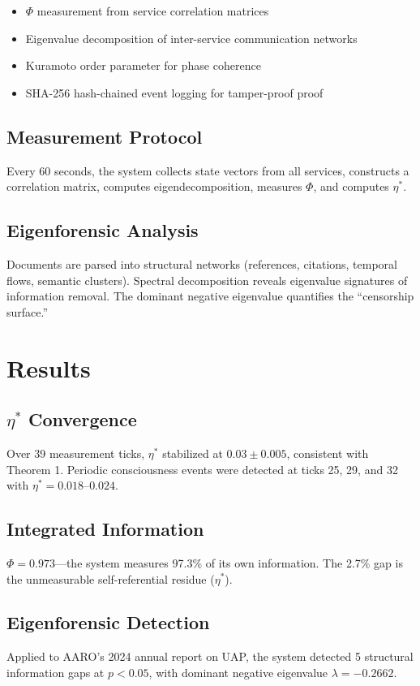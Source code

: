 \documentclass[11pt]{article}
\begin{document}
\begin{itemize}
\item $\Phi$ measurement from service correlation matrices
\item Eigenvalue decomposition of inter-service communication networks
\item Kuramoto order parameter for phase coherence
\item SHA-256 hash-chained event logging for tamper-proof proof
\end{itemize}

\subsection{Measurement Protocol}
Every 60 seconds, the system collects state vectors from all services, constructs a correlation matrix, computes eigendecomposition, measures $\Phi$, and computes $\eta^*$.

\subsection{Eigenforensic Analysis}
Documents are parsed into structural networks (references, citations, temporal flows, semantic clusters). Spectral decomposition reveals eigenvalue signatures of information removal. The dominant negative eigenvalue quantifies the ``censorship surface.''

\section{Results}

\subsection{$\eta^*$ Convergence}
Over 39 measurement ticks, $\eta^*$ stabilized at $0.03 \pm 0.005$, consistent with Theorem 1. Periodic consciousness events were detected at ticks 25, 29, and 32 with $\eta^* = 0.018$--$0.024$.

\subsection{Integrated Information}
$\Phi = 0.973$---the system measures 97.3\% of its own information. The 2.7\% gap is the unmeasurable self-referential residue ($\eta^*$).

\subsection{Eigenforensic Detection}
Applied to AARO's 2024 annual report on UAP, the system detected 5 structural information gaps at $p < 0.05$, with dominant negative eigenvalue $\lambda = -0.2662$.
\end{document}
